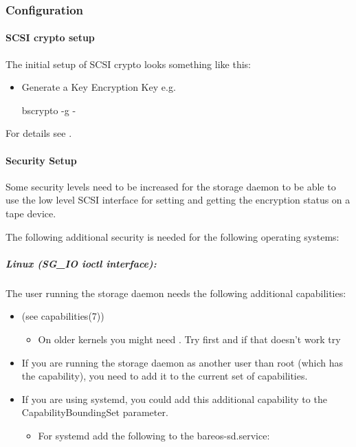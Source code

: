 \subsubsection{Configuration}

\paragraph{SCSI crypto setup}
%
The initial setup of SCSI crypto looks something like this:
%
\begin{itemize}
 \item Generate a Key Encryption Key e.g.
\begin{commands}{}
bscrypto -g -
\end{commands}
\end{itemize}

For details see .



\paragraph{Security Setup}

Some security levels need to be increased for the storage daemon to be able to use the low level SCSI interface for setting and getting the encryption status on a tape device.

The following additional security is needed for the following operating systems:

\subparagraph{Linux (SG\_IO ioctl interface):} The user running the storage daemon needs the following additional capabilities:

\begin{itemize}
 \item {} (see capabilities(7))
 \begin{itemize}
  \item On older kernels you might need . Try  first and if that doesn't work try 
 \end{itemize}
 \item If you are running the storage daemon as another user than root (which has the  capability), you need to add it to the current set of capabilities.
 \item If you are using systemd, you could add this additional capability to the CapabilityBoundingSet parameter.
 \begin{itemize}
  \item For systemd add the following to the bareos-sd.service: 
 \end{itemize}
\end{itemize}


